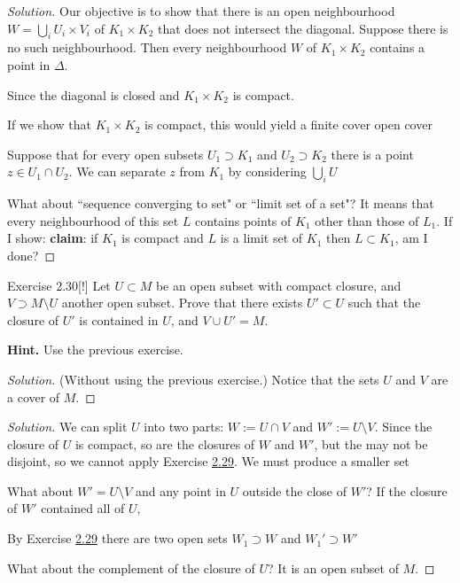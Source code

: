 \begin{proof}[Solution]
Our objective is to show that there is an open neighbourhood \(W= \bigcup_{i} U_i \times V_i\) of \(K_1 \times K_2\) that does not intersect the diagonal. Suppose there is no such neighbourhood. Then every neighbourhood \(W\) of \(K_1\times K_2\) contains a point in \(\Delta\).

Since the diagonal is closed and \(K_1 \times K_2\) is compact.

If we show that \(K_1 \times K_2\) is compact, this would yield a finite cover open cover




	Suppose that for every open subsets \(U_1 \supset K_1\) and \(U_2 \supset K_2\) there is a point \(z \in U_1 \cap U_2\). We can separate \(z\) from \(K_1\) by considering \(\bigcup_{i} U\)

What about ``sequence converging to set" or ``limit set of a set"? It means that every  neighbourhood of this set \(L\) contains points of \(K_1\) other than those of \(L_1\). If I show: \textbf{claim}: if \(K_1\) is compact and \(L\) is a limit set of \(K_1\) then \(L \subset K_1\), am I done?
\end{proof}
\fi

\begin{thing4}{Exercise 2.30}[!]\label{exer:2.30}\leavevmode
Let \(U \subset M\) be an open subset with compact closure, and \(V \supset M\setminus U\) another open subset. Prove that there exists \(U' \subset U\) such that the closure of \(U'\) is contained in \(U\), and \(V \cup  U'=M\).

\textbf{Hint.} Use the previous exercise.
\end{thing4}

\begin{proof}[Solution]\leavevmode
	(Without using the previous exercise.) Notice that the sets \(U\) and  \(V\) are a cover of \(M\).
\end{proof}

\begin{proof}[Solution]\leavevmode
We can split \(U\) into two parts: \(W:=U\cap V\) and \(W':=U\setminus V\). Since the closure of \(U\) is compact, so are the closures of \(W\) and \(W'\), but the may not be disjoint, so we cannot apply Exercise \hyperref[exer:2.29]{2.29}. We must produce a smaller set

What about \(W'=U \setminus V\) and any point in \(U\) outside the close of \(W'\)? If the closure of \(W'\) contained all of \(U\),  

By Exercise \hyperref[exer:2.29]{2.29} there are two open sets \(W_1 \supset W\) and \(W_1' \supset W'\) 

What about the complement of the closure of \(U\)? It is an open subset of \(M\).

\end{proof}

